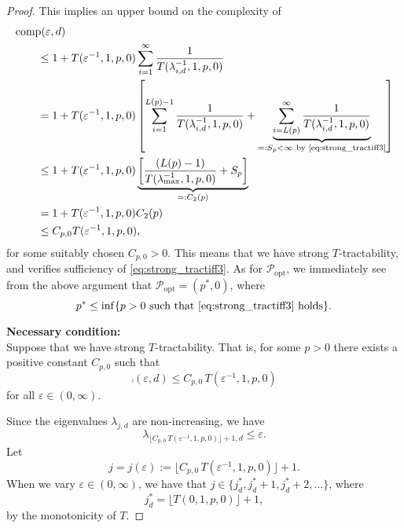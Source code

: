 \documentclass[11pt,a4paper]{article}
\begin{document}
\begin{proof}
This implies an upper bound on the complexity of
\begin{align*}
       \MoveEqLeft{\comp(\varepsilon,d)} \\
       &\le 1 + T(\varepsilon^{-1},1,p,0) \sum_{i=1}^\infty \frac{1}{T(\lambda_{i, d}^{-1},1,p,0)} \\
       & = 1 + T(\varepsilon^{-1},1, p,0) \left [ \sum_{i=1}^{L(p)-1} \frac{1}{T(\lambda_{i, d}^{-1},1,p,0)}
       + \underbrace{\sum_{i=L(p)}^\infty \frac{1}{T(\lambda_{i, d}^{-1},1,p,0)}}_{=:S_p <\infty\ \text{by \eqref{eq:strong_tractiff3}} }\right] \\
       & \le 1+ T(\varepsilon^{-1},1,p,0) \underbrace{\left[\frac{(L(p)-1)}{T(\lambda_{\max}^{-1},1,p,0)} + S_p\right]}_{=:C_2(p)}\\
       & = 1+ T(\varepsilon^{-1},1,p,0) C_2 (p)\\
       &\le C_{p,0} T(\varepsilon^{-1},1,p,0),
\end{align*}
for some suitably chosen $C_{p,0}>0$. This means that we have strong $T$-tractability, and verifies sufficiency of \eqref{eq:strong_tractiff3}.
As for $\mathcal{P}_{\text{opt}}$, we immediately see from the above argument that $\mathcal{P}_{\text{opt}}=(p^*,0)$, where
\[
 p^* \le \inf\{p>0\ \mbox{such that \eqref{eq:strong_tractiff3} holds}\}.
\]


\bigskip
\noindent \textbf{Necessary condition:} \\
Suppose that we have strong
$T$-tractability. That is, for some $p>0$ there exists a positive constant $C_{p,0}$ such that
\[
\comp(\varepsilon,d)\le C_{p,0}\, T(\varepsilon^{-1},1,p,0)
\]
for all $\varepsilon\in (0,\infty)$.


%

Since the eigenvalues $\lambda_{j,d}$ are non-increasing, we have
\begin{equation}\label{eq:lambda_K_strong3}
\lambda_{\lfloor C_{p,0}\, T(\varepsilon^{-1},1,p,0)\rfloor +1,d}\le \varepsilon.
\end{equation}
Let
\[
j=j (\varepsilon):= \lfloor C_{p,0}\, T(\varepsilon^{-1},1,p,0)\rfloor +1.
\]
When we vary $\varepsilon\in (0,\infty)$, we have that $j\in \{j_d^*, j_d^*+1, j_d^*+2,\ldots\}$, where
\[
  j_d^*=\lfloor  T(0,1,p,0)\rfloor +1,
\]
by the monotonicity of $T$.


\end{proof}
\end{document}
